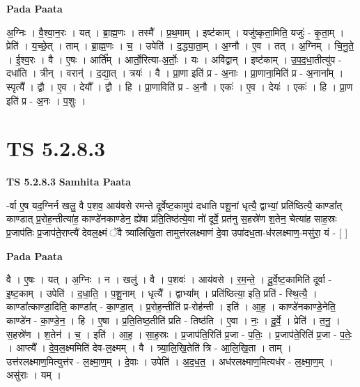 \documentclass[17pt]{extarticle}
\begin{document}
\textbf{Pada Paata} \newline

अ॒ग्निः । वै॒श्वा॒न॒रः । यत् । ब्रा॒ह्म॒णः । तस्मै᳚ । प्र॒थ॒माम् । इष्ट॑काम् । यजु॑ष्कृता॒मिति॒ यजुः॑ - कृ॒ता॒म् । प्रेति॑ । य॒च्छे॒त् । ताम् । ब्रा॒ह्म॒णः । च॒ । उपेति॑ । द॒द्ध्या॒ता॒म् । अ॒ग्नौ । ए॒व । तत् । अ॒ग्निम् । चि॒नु॒ते॒ । ई॒श्व॒रः । वै । ए॒षः । आर्ति᳚म् । आर्तो॒रित्या-अ॒र्तोः॒ । यः । अवि॑द्वान् । इष्ट॑काम् । उ॒प॒द॒धा॒तीत्यु॑प - दधा॑ति । त्रीन् । वरान्॑ । द॒द्या॒त् । त्रयः॑ । वै । प्रा॒णा इति॑ प्र - अ॒नाः । प्रा॒णाना॒मिति॑ प्र - अ॒नाना᳚म् । स्पृत्यै᳚ । द्वौ । ए॒व । देयौ᳚ । द्वौ । हि । प्रा॒णाविति॑ प्र - अ॒नौ । एकः॑ । ए॒व । देयः॑ । एकः॑ । हि । प्रा॒ण इति॑ प्र - अ॒नः । प॒शुः ।  \newline





\section{ TS 5.2.8.3 }

\textbf{TS 5.2.8.3 } \newline
\textbf{Samhita Paata} \newline

-र्वा ए॒ष यद॒ग्निर्न खलु॒ वै प॒शव॒ आय॑वसे रमन्ते दूर्वेष्ट॒कामुप॑ दधाति पशू॒नां धृत्यै॒ द्वाभ्यां॒ प्रति॑ष्ठित्यै॒ काण्डा᳚त् काण्डात् प्र॒रोह॒न्तीत्या॑ह॒ काण्डे॑नकाण्डेन॒ ह्ये॑षा प्र॑ति॒तिष्ठ॑त्ये॒वा नो॑ दूर्वे॒ प्रत॑नु स॒हस्रे॑ण श॒तेन॒ चेत्या॑ह साह॒स्रः प्र॒जाप॑तिः प्र॒जाप॑ते॒राप्त्यै॑ देवल॒क्ष्मं ॅवै त्र्या॑लिखि॒ता तामुत्त॑रलक्ष्माणं दे॒वा उपा॑दध॒ता-ध॑रलक्ष्माण॒-मसु॑रा॒ यं - [  ] \newline

\textbf{Pada Paata} \newline

वै । ए॒षः । यत् । अ॒ग्निः । न । खलु॑ । वै । प॒शवः॑ । आय॑वसे । र॒म॒न्ते॒ । दू॒र्वे॒ष्ट॒कामिति॑ दूर्वा - इ॒ष्ट॒काम् । उपेति॑ । द॒धा॒ति॒ । प॒शू॒नाम् । धृत्यै᳚ । द्वाभ्या᳚म् । प्रति॑ष्ठित्या॒ इति॒ प्रति॑ - स्थि॒त्यै॒ । काण्डा᳚त्काण्डा॒दिति॒ काण्डा᳚त् - का॒ण्डा॒त् । प्र॒रोह॒न्तीति॑ प्र-रोह॑न्ती । इति॑ । आ॒ह॒ । काण्डे॑नकाण्डे॒नेति॒ काण्डे॑न - का॒ण्डे॒न॒ । हि । ए॒षा । प्र॒ति॒तिष्ठ॒तीति॑ प्रति - तिष्ठ॑ति । ए॒वा । नः॒ । दू॒र्वे॒ । प्रेति॑ । त॒नु॒ । स॒हस्रे॑ण । श॒तेन॑ । च॒ । इति॑ । आ॒ह॒ । सा॒ह॒स्रः । प्र॒जाप॑ति॒रिति॑ प्र॒जा - प॒तिः॒ । प्र॒जाप॑ते॒रिति॑ प्र॒जा - प॒तेः॒ । आप्त्यै᳚ । दे॒व॒ल॒क्ष्ममिति॑ देव-ल॒क्ष्मम् । वै । त्र्या॒लि॒खि॒तेति॑ त्रि - आ॒लि॒खि॒ता । ताम् । उत्त॑रलक्ष्माण॒मित्युत्त॑र - ल॒क्ष्मा॒ण॒म् । दे॒वाः । उपेति॑ । अ॒द॒ध॒त॒ । अध॑रलक्ष्माण॒मित्यध॑र - ल॒क्ष्मा॒ण॒म् । असु॑राः । यम् ।  \newline
\end{document}
